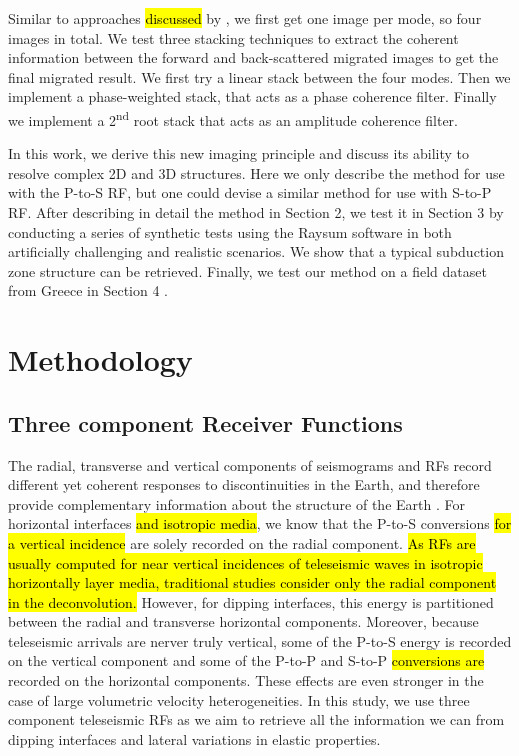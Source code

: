 \documentclass[10pt,a4paper]{article}
\begin{document}
Similar to approaches \hl{discussed} by \citet{rond_sgeo_09}, we first get one image per mode, so four images in total.
We test three stacking techniques to extract the coherent information between the forward and back-scattered migrated images to get the final migrated result.
We first try a linear stack between the four modes.
Then we implement a phase-weighted stack, that acts as a phase coherence filter.
Finally we implement a 2\textsuperscript{nd} root stack that acts as an amplitude coherence filter.

In this work, we derive this new imaging principle and discuss its ability to resolve complex 2D and 3D structures. 
Here we only describe the method for use with the P-to-S RF, but one could devise a similar method for use with S-to-P RF. 
After describing in detail the method in Section 2, we test it in Section 3 by conducting a series of synthetic tests using the Raysum software \citep{fred_gji_00} in both artificially challenging and realistic scenarios. 
We show that a typical subduction zone structure can be retrieved.
Finally, we test our method on a field dataset from Greece in Section 4 \citep{pear_jgr_12}.

\section{Methodology}

\subsection{Three component Receiver Functions}

The radial, transverse and vertical components of seismograms and RFs record different yet coherent responses to discontinuities in the Earth, and therefore provide complementary information about the structure of the Earth \citep{tone_epsl_08}.
For horizontal interfaces \hl{and isotropic media}, we know that the P-to-S conversions \hl{for a vertical incidence} are solely recorded on the radial component. 
\hl{As RFs are usually computed for near vertical incidences of teleseismic waves in isotropic horizontally layer media, traditional studies consider only the radial component in the deconvolution.}
However, for dipping interfaces, this energy is partitioned between the radial and transverse horizontal components.
Moreover, because teleseismic arrivals are nerver truly vertical, some of the P-to-S energy is recorded on the vertical component and some of the P-to-P and S-to-P \hl{conversions are} recorded on the horizontal components.
These effects are even stronger in the case of large volumetric velocity heterogeneities.
In this study, we use three component teleseismic RFs as we aim to retrieve all the information we can from dipping interfaces and lateral variations in elastic properties.
\end{document}
